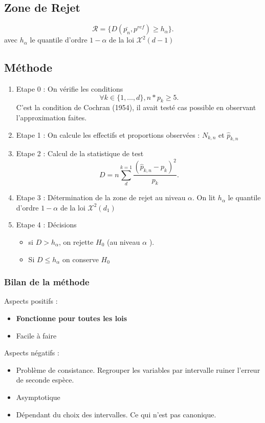 \documentclass{article}
\theoremstyle{plain}%
\theoremstyle{definition}
\theoremstyle{remark}
\begin{document}
\subsection*{Zone de Rejet}
\[
    \mathcal{R} = \{D(\bar{p_n}, p^{ref}) \geq h_\alpha\}
.\]
avec $ h_\alpha  $ le quantile d'ordre $ 1-\alpha  $ de la loi $ \mathcal{X}^2(d-1) $

\subsection*{Méthode}
\begin{enumerate}
    \item Etape 0 : On vérifie les conditions 
    \[
        \forall k \in \{1, \dots, d\}, n*p_k \geq 5
    .\]
    C'est la condition de Cochran (1954), il avait testé cas possible en observant l'approximation faites.
    \item Etape 1 : On calcule les effectifs et proportions observées : $ N_{k,n} $ et $ \hat{p}_{k,n} $  
    \item Etape 2 : Calcul de la statistique de test 
    \[
        D = n \sum_{d}^{k=1} \frac{(\hat{p}_{k,n} - p_k)^2}{p_k}
    .\]
    \item Etape 3 : Détermination de la zone de rejet au niveau $ \alpha  $. On lit $ h_\alpha  $ le quantile d'ordre $ 1-\alpha  $ de la loi $ \mathcal{X}^2(d_1) $ 
    \item Etape 4 : Décisions \begin{itemize}
        \item si $ D > h_\alpha  $, on rejette $ H_0 $ (au niveau $ \alpha  $ ). 
        \item Si $ D \leq h_\alpha  $ on conserve $ H_0 $ 
    \end{itemize}
\end{enumerate}

\subsubsection*{Bilan de la méthode}
Aspects positifs : 
\begin{itemize}
    \item \textbf{Fonctionne pour toutes les lois}
    \item Facile à faire
\end{itemize}

Aspects négatifs : 
\begin{itemize}
    \item Problème de consistance. Regrouper les variables par intervalle ruiner l'erreur de seconde espèce.
    \item Asymptotique
    \item Dépendant du choix des intervalles. Ce qui n'est pas canonique.
\end{itemize}
\end{document}
